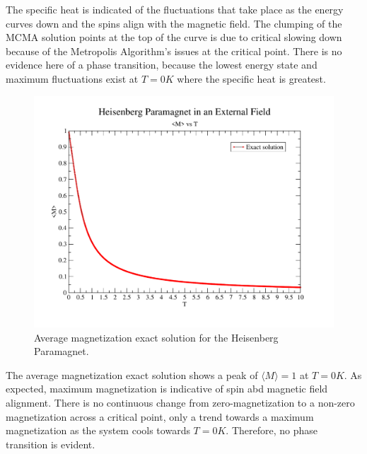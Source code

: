 \documentclass[a4paper,12pt]{article}
\begin{document}
		The specific heat is indicated of the fluctuations that take place as the energy curves down and the spins align with the magnetic field. The clumping of the MCMA solution points at the top of the curve is due to critical slowing down because of the Metropolis Algorithm's issues at the critical point. There is no evidence here of a phase transition, because the lowest energy state and maximum fluctuations exist at $T = 0 K$ where the specific heat is greatest.
		
		\begin{figure}[H]
			\centering
			\includegraphics[scale=0.65]{m_avg_PM.pdf}
			\caption{Average magnetization exact solution for the Heisenberg Paramagnet.}
			\label{fig:heisenberg_PM_m_avg}
		\end{figure}
		
		The average magnetization exact solution shows a peak of $\langle M \rangle = 1$ at $T = 0 K$. As expected, maximum magnetization is indicative of spin abd magnetic field alignment. There is no continuous change from zero-magnetization to a non-zero magnetization across a critical point, only a trend towards a maximum magnetization as the system cools towards $T = 0 K$. Therefore, no phase transition is evident.
\end{document}
